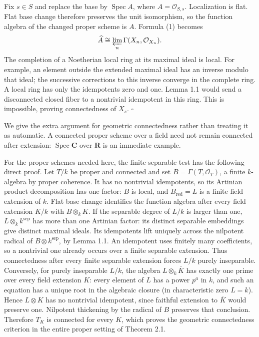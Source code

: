 \documentclass[11pt]{article}
\begin{document}
Fix \(s\in S\) and replace the base by \(\operatorname{Spec}A\), where
\(A=\mathcal O_{S,s}\). Localization is flat. Flat base change therefore
preserves the unit isomorphism, so the function algebra of the changed
proper scheme is \(A\). Formula (1) becomes \[
\widehat A\cong\varprojlim_n\Gamma(X_n,\mathcal O_{X_n}).
\] The completion of a Noetherian local ring at its maximal ideal is
local. For example, an element outside the extended maximal ideal has an
inverse modulo that ideal; the successive corrections to this inverse
converge in the complete ring. A local ring has only the idempotents
zero and one. Lemma 1.1 would send a disconnected closed fiber to a
nontrivial idempotent in this ring. This is impossible, proving
connectedness of \(X_s\). \(\square\)

We give the extra argument for geometric connectedness rather than
treating it as automatic. A connected proper scheme over a field need
not remain connected after extension: \(\operatorname{Spec}\mathbf C\)
over \(\mathbf R\) is an immediate example.

For the proper schemes needed here, the finite-separable test has the
following direct proof. Let \(T/k\) be proper and connected and set
\(B=\Gamma(T,\mathcal O_T)\), a finite \(k\)-algebra by proper
coherence. It has no nontrivial idempotents, so its Artinian product
decomposition has one factor: \(B\) is local, and \(B_{\mathrm{red}}=L\)
is a finite field extension of \(k\). Flat base change identifies the
function algebra after every field extension \(K/k\) with
\(B\otimes_kK\). If the separable degree of \(L/k\) is larger than one,
\(L\otimes_k k^{\mathrm{sep}}\) has more than one Artinian factor: its
distinct separable embeddings give distinct maximal ideals. Its
idempotents lift uniquely across the nilpotent radical of
\(B\otimes k^{\mathrm{sep}}\), by Lemma 1.1. An idempotent uses finitely
many coefficients, so a nontrivial one already occurs over a finite
separable extension. Thus connectedness after every finite separable
extension forces \(L/k\) purely inseparable. Conversely, for purely
inseparable \(L/k\), the algebra \(L\otimes_k\overline K\) has exactly
one prime over every field extension \(K\): every element of \(L\) has a
power \(p^a\) in \(k\), and such an equation has a unique root in the
algebraic closure (in characteristic zero \(L=k\)). Hence \(L\otimes K\)
has no nontrivial idempotent, since faithful extension to
\(\overline K\) would preserve one. Nilpotent thickening by the radical
of \(B\) preserves that conclusion. Therefore \(T_K\) is connected for
every \(K\), which proves the geometric connectedness criterion in the
entire proper setting of Theorem 2.1.
\end{document}
